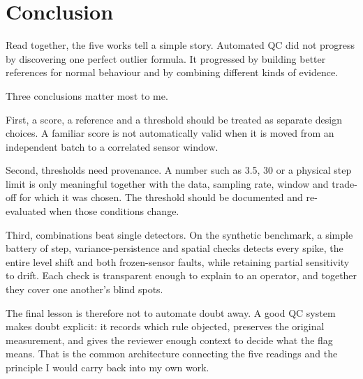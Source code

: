 \clearpage
\section{Conclusion}
\label{sec:conclusion}

Read together, the five works tell a simple story. Automated QC did not
progress by discovering one perfect outlier formula. It progressed by
building better references for normal behaviour and by combining different
kinds of evidence.

Three conclusions matter most to me.

First, a score, a reference and a threshold should be treated as separate
design choices. A familiar score is not automatically valid when it is moved
from an independent batch to a correlated sensor window.

Second, thresholds need provenance. A number such as 3.5, 30 or a physical
step limit is only meaningful together with the data, sampling rate, window
and trade-off for which it was chosen. The threshold should be documented
and re-evaluated when those conditions change.

Third, combinations beat single detectors. On the synthetic benchmark, a
simple battery of step, variance-persistence and spatial checks detects every
spike, the entire level shift and both frozen-sensor faults, while retaining
partial sensitivity to drift. Each check is transparent enough to explain to
an operator, and together they cover one another's blind spots.

The final lesson is therefore not to automate doubt away. A good QC system
makes doubt explicit: it records which rule objected, preserves the original
measurement, and gives the reviewer enough context to decide what the flag
means. That is the common architecture connecting the five readings and the
principle I would carry back into my own work.


